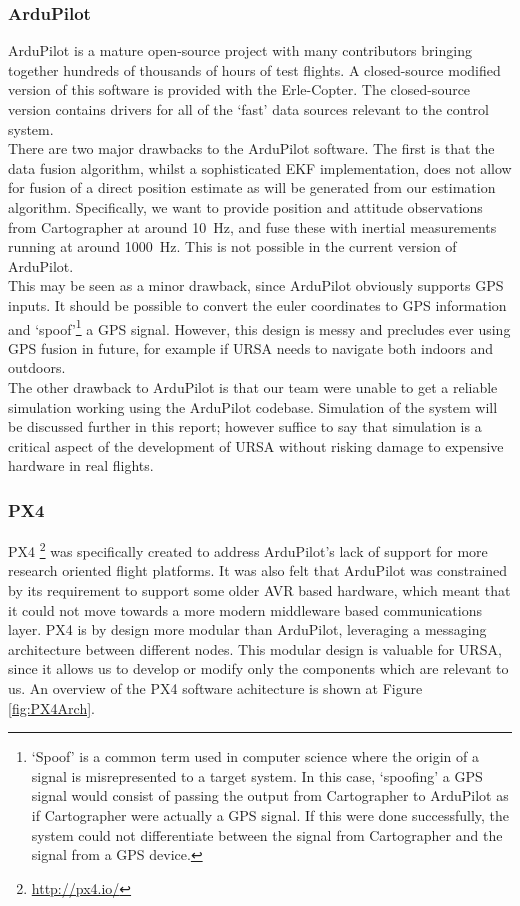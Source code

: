 \documentclass[capstone_report.tex]{subfiles}
\begin{document}
\subsubsection{ArduPilot}
ArduPilot \cite{arduhistory} is a mature open-source project with many contributors bringing together hundreds of thousands of hours of test flights. A closed-source modified version of this software is provided with the Erle-Copter. The closed-source version contains drivers for all of the `fast' data sources relevant to the control system. \\

There are two major drawbacks to the ArduPilot software. The first is that the data fusion algorithm, whilst a sophisticated EKF implementation, does not allow for fusion of a direct position estimate as will be generated from our estimation algorithm. Specifically, we want to provide position and attitude observations from Cartographer at around \SI{10}{\hertz}, and fuse these with inertial measurements running at around \SI{1000}{\hertz}. This is not possible in the current version of ArduPilot.\\

This may be seen as a minor drawback, since ArduPilot obviously supports GPS inputs. It should be possible to convert the euler coordinates to GPS information and `spoof'\footnote{`Spoof' is a common term used in computer science where the origin of a signal is misrepresented to a target system. In this case, `spoofing' a GPS signal would consist of passing the output from Cartographer to ArduPilot as if Cartographer were actually a GPS signal. If this were done successfully, the system could not differentiate between the signal from Cartographer and the signal from a GPS device.} a GPS signal. However, this design is messy and precludes ever using GPS fusion in future, for example if URSA needs to navigate both indoors and outdoors. \\

The other drawback to ArduPilot is that our team were unable to get a reliable simulation working using the ArduPilot codebase. Simulation of the system will be discussed further in this report; however suffice to say that simulation is a critical aspect of the development of URSA without risking damage to expensive hardware in real flights.

\subsubsection{PX4}
PX4 \footnote{\url{http://px4.io/}} was specifically created to address ArduPilot's lack of support for more research oriented flight platforms. It was also felt that ArduPilot was constrained by its requirement to support some older AVR based hardware, which meant that it could not move towards a more modern middleware based communications layer. PX4 is by design more modular than ArduPilot, leveraging a messaging architecture between different nodes. This modular design is valuable for URSA, since it allows us to develop or modify only the components which are relevant to us. An overview of the PX4 software achitecture is shown at Figure \ref{fig:PX4Arch}.\\
\end{document}
